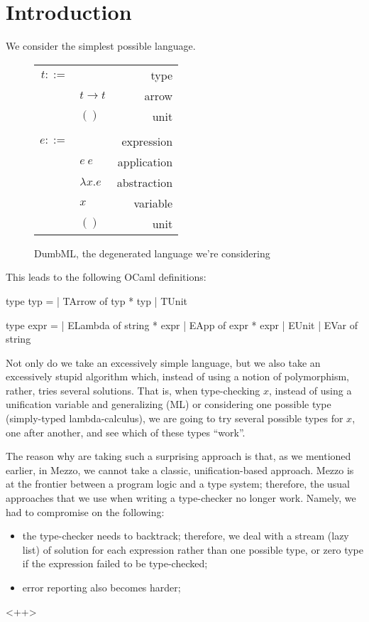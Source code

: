 \section{Introduction}

We consider the simplest possible language.

\begin{figure}[h]
  \begin{tabularx}{\columnwidth}{rlR}
    $t ::=$ & & type \\
            & $t \to t$       & arrow \\
            & $()$            & unit \\
      \\[1ex]
    $e ::=$ & & expression \\
            & $e \ e$         & application \\
            & $\lambda x.e $  & abstraction \\
            & $x$             & variable \\
            & $()$            & unit \\
  \end{tabularx}
  \caption{DumbML, the degenerated language we're considering}
  \label{fig:syntax}
\end{figure}

This leads to the following OCaml definitions:

\begin{ocamlcode}
type typ =
  | TArrow of typ * typ
  | TUnit

type expr =
  | ELambda of string * expr
  | EApp of expr * expr
  | EUnit
  | EVar of string
\end{ocamlcode}

Not only do we take an excessively simple language, but we also take an
excessively stupid algorithm which, instead of using a notion of polymorphism,
rather, tries several solutions. That is, when type-checking $x$, instead of
using a unification variable and generalizing (ML) or considering one possible
type (simply-typed lambda-calculus), we are going to try several possible types
for $x$, one after another, and see which of these types ``work''.

The reason why are taking such a surprising approach is that, as we mentioned
earlier, in Mezzo, we cannot take a classic, unification-based approach. Mezzo
is at the frontier between a program logic and a type system; therefore, the
usual approaches that we use when writing a type-checker no longer work. Namely,
we had to compromise on the following:
\begin{itemize}
  \item the type-checker needs to backtrack; therefore, we deal with a stream
    (lazy list) of solution for each expression rather than one possible type,
    or zero type if the expression failed to be type-checked;
  \item error reporting also becomes harder; 
\end{itemize}<++>

